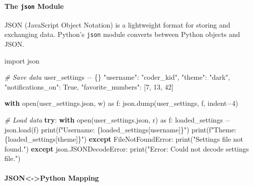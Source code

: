 \documentclass[
  justified,
  openright,
]{tufte-book}
\let\subsection\paragraph
\let\paragraph\paragraph
\newcommand{\KeywordTok}[1]{\textcolor{CodeKeyword}{\textbf{#1}}}  %
\newcommand{\StringTok}[1]{\textcolor{CodeString}{#1}}              %
\newcommand{\CommentTok}[1]{\textcolor{CodeComment}{\textit{#1}}}  %
\newcommand{\CodeNumTok}[1]{\textcolor{CodeNumber}{#1}}             %
\newcommand{\CodeAccentTok}[1]{\textcolor{CodeAccent}{#1}}          %
\newcommand{\OperatorTok}[1]{\textcolor{DarkGray}{#1}}              %
\newenvironment{Shaded}{%
  \begin{mdframed}[style=TufteCode]%
}{%
  \end{mdframed}%
}
\let\subsection\paragraph
\let\paragraph\paragraph
\begin{document}
\subsection{\texorpdfstring{The \texttt{json}
Module}{The json Module}}\label{the-json-module}

JSON (JavaScript Object Notation) is a lightweight format for storing
and exchanging data. Python's \texttt{json} module converts between
Python objects and JSON.

\begin{Shaded}
\begin{Highlighting}[]
\CodeAccentTok{import} json
 
\CommentTok{\# Save data}
user\_settings \OperatorTok{=} \{\}
    \StringTok{"username"}: \StringTok{"coder\_kid"},
    \StringTok{"theme"}: \StringTok{"dark"},
    \StringTok{"notifications\_on"}: True,
    \StringTok{"favorite\_numbers"}: [\CodeNumTok{7}, \CodeNumTok{13}, \CodeNumTok{42}]
\
 
\KeywordTok{with} open(\StringTok{\textquotesingle{}user\_settings.json\textquotesingle{}}, \StringTok{\textquotesingle{}w\textquotesingle{}}) \CodeAccentTok{as} f:
    json.dump(user\_settings, f, indent\OperatorTok{=}\CodeNumTok{4})
 
\CommentTok{\# Load data}
\KeywordTok{try}:
    \KeywordTok{with} open(\StringTok{\textquotesingle{}user\_settings.json\textquotesingle{}}, \StringTok{\textquotesingle{}r\textquotesingle{}}) \CodeAccentTok{as} f:
        loaded\_settings \OperatorTok{=} json.load(f)
    print(\StringTok{f"Username: }\StringTok{\{}loaded\_settings[\StringTok{\textquotesingle{}username\textquotesingle{}}]\StringTok{\}}\StringTok{"})
    print(\StringTok{f"Theme: }\StringTok{\{}loaded\_settings[\StringTok{\textquotesingle{}theme\textquotesingle{}}]\StringTok{\}}\StringTok{"})
\KeywordTok{except} \CodeAccentTok{FileNotFoundError}:
    print(\StringTok{"Settings file not found."})
\KeywordTok{except} json.JSONDecodeError:
    print(\StringTok{"Error: Could not decode settings file."})
\end{Highlighting}
\end{Shaded}

\subsection{JSON\textless-\textgreater Python
Mapping}\label{json-python-mapping}
\end{document}
